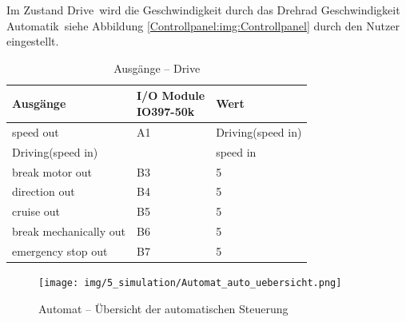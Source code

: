 Im Zustand \frqq Drive\flqq\ wird die Geschwindigkeit durch das Drehrad  \frqq Geschwindigkeit Automatik\flqq\ siehe Abbildung \ref{Controllpanel:img:Controllpanel} durch den Nutzer eingestellt.

\pagebreak[1]
\begin{table}[!ht]
	\centering
	\caption{Ausgänge – Drive}
	\label{Automat_man:tab:drive}
	\begin{tabular}{lll}
		\hline
		\textbf{Ausgänge}                           & \makecell{\textbf{I/O Module}                     \\ \textbf{IO397-50k}}                 & \textbf{Wert} \\ \hline
		\multicolumn{1}{l|}{speed out}              & \multicolumn{1}{l|}{A1}       & Driving(speed in) \\
		\multicolumn{1}{l|}{Driving(speed in)}      & \multicolumn{1}{l|}{}         & speed in          \\
		\multicolumn{1}{l|}{break motor out}        & \multicolumn{1}{l|}{B3}       & 5                 \\
		\multicolumn{1}{l|}{direction out}          & \multicolumn{1}{l|}{B4}       & 5                 \\
		\multicolumn{1}{l|}{cruise out}             & \multicolumn{1}{l|}{B5}       & 5                 \\
		\multicolumn{1}{l|}{break mechanically out} & \multicolumn{1}{l|}{B6}       & 5                 \\
		\multicolumn{1}{l|}{emergency stop out}     & \multicolumn{1}{l|}{B7}       & 5                 \\ \hline
	\end{tabular}
\end{table}
\pagebreak[2]

\pagebreak[1]
\begin{figure}[!ht]
	\begin{center}
		\texttt{[image: img/5\_simulation/Automat\_auto\_uebersicht.png]}
		\caption{Automat – Übersicht der automatischen Steuerung}
		\label{Automat:img:auto_übersicht}
	\end{center}
\end{figure}
\pagebreak[1]













